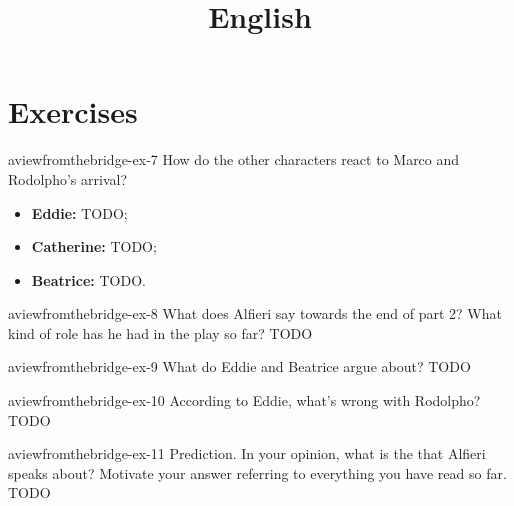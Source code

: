 \documentclass[preview]{standalone}
\begin{document}
\title{English}
\genpage

\section{Exercises}

\begin{snippetexercise}{aviewfromthebridge-ex-7}
{How do the other characters react to Marco and Rodolpho's arrival?}
\begin{itemize}
    \item \textbf{Eddie:} TODO;
    \item \textbf{Catherine:} TODO;
    \item \textbf{Beatrice:} TODO.
\end{itemize}
\end{snippetexercise}

\begin{snippetexercise}{aviewfromthebridge-ex-8}
{What does Alfieri say towards the end of part 2? What kind of role has he had in the play so far?}
TODO
\end{snippetexercise}

\begin{snippetexercise}{aviewfromthebridge-ex-9}
{What do Eddie and Beatrice argue about?}
TODO
\end{snippetexercise}

\begin{snippetexercise}{aviewfromthebridge-ex-10}
{According to Eddie, what's wrong with Rodolpho?}
TODO
\end{snippetexercise}

\begin{snippetexercise}{aviewfromthebridge-ex-11}
{Prediction. In your opinion, what is the  that Alfieri speaks
about? Motivate your answer referring to everything you have read so far.}
TODO
\end{snippetexercise}
\end{document}
